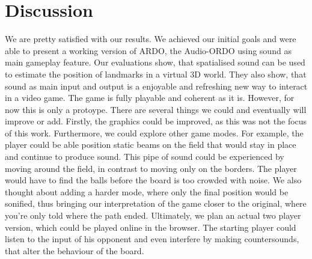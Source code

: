 \documentclass[conference]{IEEEtran}
\begin{document}
\section{Discussion}
We are pretty satisfied with our results.
We achieved our initial goals and were able to present a working version of ARDO, the Audio-ORDO using sound as main gameplay feature.
Our evaluations show, that spatialised sound can be used to estimate the position of landmarks in a virtual 3D world.
They also show, that sound as main input and output is a enjoyable and refreshing new way to interact in a video game.
The game is fully playable and coherent as it is. 
However, for now this is only a protoype.
There are several things we could and eventually will improve or add.
Firstly, the graphics could be improved, as this was not the focus of this work.
Furthermore, we could explore other game modes. 
For example, the player could be able position static beams on the field that would stay in place and continue to produce sound.
This pipe of sound could be experienced by moving around the field, in contrast to moving only on the borders.
The player would have to find the balls before the board is too crowded with noise. 
We also thought about adding a harder mode, where only the final position would be sonified, thus bringing our interpretation of the game closer to the original, where you’re only told where the path ended.
Ultimately, we plan an actual two player version, which could be played online in the browser.
The starting player could listen to the input of his opponent and even interfere by making countersounds, that alter the behaviour of the board.
% 
% 


% 
\end{document}
